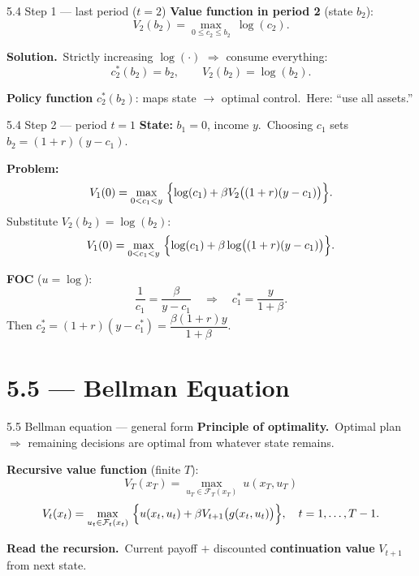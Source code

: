\documentclass[11pt,aspectratio=169]{beamer}
\begin{document}
\begin{frame}{5.4 Step 1 --- last period ($t=2$)}
  \small
  \textbf{Value function in period 2} (state $b_2$):
  \[
    V_2(b_2)=\max_{0\le c_2\le b_2}\ \log(c_2).
  \]

  \medskip
  \textbf{Solution.}\
  Strictly increasing $\log(\cdot)$ $\Rightarrow$ consume everything:
  \[
    c_2^*(b_2)=b_2,
    \qquad
    V_2(b_2)=\log(b_2).
  \]

  \medskip
  \textbf{Policy function} $c_2^*(b_2)$: maps state $\to$ optimal control.\
  Here: ``use all assets.''
\end{frame}

\begin{frame}{5.4 Step 2 --- period $t=1$}
  \small
  \textbf{State:} $b_1=0$, income $y$.\
  Choosing $c_1$ sets $b_2=(1+r)(y-c_1)$.

  \medskip
  \textbf{Problem:}
  \[
    V_1(0)=\max_{0<c_1<y}\ \Bigl\{\log(c_1)+\beta V_2\bigl((1+r)(y-c_1)\bigr)\Bigr\}.
  \]
  Substitute $V_2(b_2)=\log(b_2)$:
  \[
    V_1(0)=\max_{0<c_1<y}\ \Bigl\{\log(c_1)+\beta\log\bigl((1+r)(y-c_1)\bigr)\Bigr\}.
  \]

  \medskip
  \textbf{FOC} ($u=\log$):
  \[
    \frac{1}{c_1}=\frac{\beta}{y-c_1}
    \quad\Longrightarrow\quad
    c_1^*=\frac{y}{1+\beta}.
  \]
  Then $c_2^*=(1+r)(y-c_1^*)=\dfrac{\beta(1+r)y}{1+\beta}$.
\end{frame}

\section{5.5 --- Bellman Equation}

\begin{frame}{5.5 Bellman equation --- general form}
  \small
  \textbf{Principle of optimality.}\
  Optimal plan $\Rightarrow$ remaining decisions are optimal from whatever state remains.

  \medskip
  \textbf{Recursive value function} (finite $T$):
  \[
    V_T(x_T)=\max_{u_T\in\mathcal{F}_T(x_T)}\ u(x_T,u_T)
  \]
  \[
    V_t(x_t)=\max_{u_t\in\mathcal{F}_t(x_t)}\ \Bigl\{u(x_t,u_t)+\beta V_{t+1}\bigl(g(x_t,u_t)\bigr)\Bigr\},
    \quad t=1,\ldots,T-1.
  \]

  \medskip
  \textbf{Read the recursion.}\
  Current payoff $+$ discounted \textbf{continuation value} $V_{t+1}$ from next state.
\end{frame}
\end{document}
